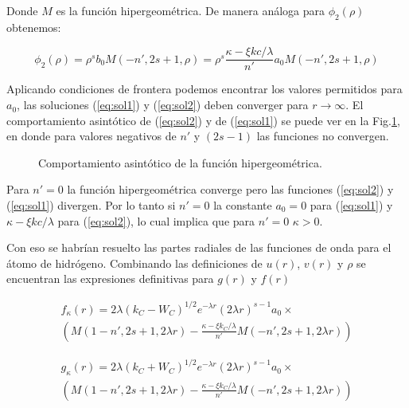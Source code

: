 \documentclass[a4paper, 12pt]{article} %
\begin{document}
Donde $M$ es la funci\'on hipergeom\'etrica. De manera an\'aloga para $\phi_2(\rho)$ obtenemos:

\begin{equation}\label{eq:sol2}
\phi_2(\rho) = \rho^s b_0 M(-n',2s+1,\rho) = \rho^s \dfrac{\kappa - \xi kc / \lambda}{n'} a_0 M(-n',2s+1,\rho)
\end{equation}

Aplicando condiciones de frontera podemos encontrar los valores permitidos para $a_0$, las soluciones
(\ref{eq:sol1}) y (\ref{eq:sol2}) deben converger para $r \rightarrow \infty$. El comportamiento 
asint\'otico de (\ref{eq:sol2}) y de (\ref{eq:sol1}) se puede ver en la Fig.\ref{fig:hypgeo}, 
en donde para valores negativos de $n'$ y $(2s-1)$ las funciones no convergen.

\begin{figure}[H]
\centering
\caption*{Comportamiento asint\'otico de la funci\'on hipergeom\'etrica.}
\label{fig:hypgeo}
\end{figure}  

Para $n' = 0$ la funci\'on hipergeom\'etrica converge pero las funciones (\ref{eq:sol2}) y (\ref{eq:sol1})
divergen. Por lo tanto si $n'=0$ la constante $a_0 = 0$ para (\ref{eq:sol1}) y $\kappa - \xi kc / \lambda$
para (\ref{eq:sol2}), lo cual implica que para $n'=0$ $\kappa > 0$. 





Con eso se habr\'ian resuelto las partes radiales de las funciones de onda para el \'atomo de hidr\'ogeno. Combinando las definiciones de $u(r)$, $v(r)$ y $\rho$ se encuentran las expresiones definitivas para $g(r)$ y $f(r)$

\begin{equation}
\begin{split}
f_{\kappa}(r)=2\lambda (k_C -W_C)^{1/2}e^{-\lambda r}(2\lambda r)^{s-1}a_0 \times \\
\left( M(1-n',2s+1,2\lambda r) - \frac{\kappa-\xi k_C /\lambda}{n'} M(-n',2s+1,2\lambda r) \right)
\end{split}
\end{equation}

\begin{equation}
\begin{split}
g_{\kappa}(r)=2\lambda (k_C +W_C)^{1/2}e^{-\lambda r}(2\lambda r)^{s-1}a_0 \times \\
\left( M(1-n',2s+1,2\lambda r) - \frac{\kappa-\xi k_C /\lambda}{n'} M(-n',2s+1,2\lambda r) \right)
\end{split}
\end{equation}
\end{document}
